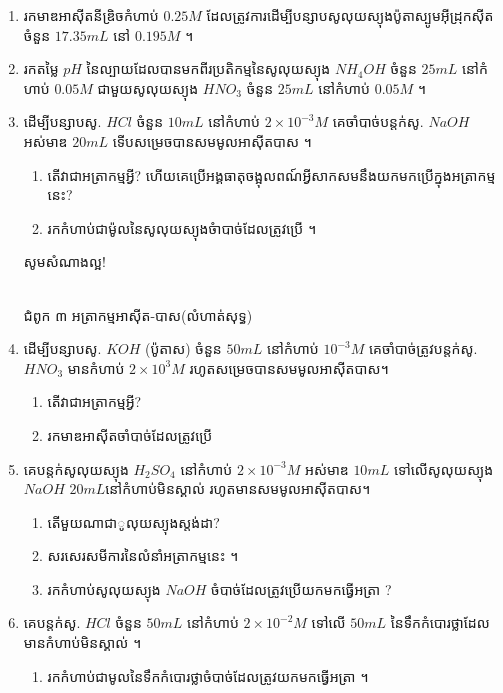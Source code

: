 \documentclass[12pt, a4paper]{article}
\begin{document}
\begin{enumerate}[m]
	\item រកមាឌអាស៊ីតនីឌ្រិចកំហាប់ $0.25M$ ដែលត្រូវការដើម្បីបន្សាបសូលុយស្យុងប៉ូតាស្បូមអ៊ីដ្រុកស៊ីតចំនួន $17.35mL$ នៅ $0.195M$ ។
	\item រកតម្លៃ $pH$ នៃល្បាយដែលបានមកពីរប្រតិកម្មនៃសូលុយស្យុង $NH_4OH$ ចំនួន $25mL$ នៅកំហាប់ $0.05M$ ជាមួយសូលុយស្យុង $HNO_3$ ចំនួន $25mL$ នៅកំហាប់ $0.05M$ ។
	\item ដើម្បីបន្សាបសូ. $HCl$ ចំនួន $10mL$ នៅកំហាប់ $2\times10^{-3}M$ គេចាំបាច់បន្តក់សូ. $NaOH$ អស់មាឌ $20mL$ ទើបសម្រេចបានសមមូលអាស៊ីតបាស ។
	\begin{enumerate}[k]
		\item តើវាជាអត្រាកម្មអ្វី? ហើយគេប្រើអង្គធាតុចង្អុលពណ៍អ្វីសាកសមនឹងយកមកប្រើក្នុងអត្រាកម្មនេះ?
		\item រកកំហាប់ជាម៉ូលនៃសូលុយស្យុងចំាបាច់ដែលត្រូវប្រើ ។
	\end{enumerate}
	\begin{center}
		\sffamily\color{black}
		សូមសំណាងល្អ!
	\end{center}\newpage
	\begin{center}
		\sffamily\color{black}
		\\
		ជំពូក ៣ អត្រាកម្មអាស៊ីត-បាស(លំហាត់សុទ្ធ)
	\end{center}
	\item ដើម្បីបន្សាបសូ. $KOH$ (ប៉ូតាស) ចំនួន $50mL$ នៅកំហាប់ $10^{-3}M$ គេចាំបាច់ត្រូវបន្តក់សូ. $HNO_3$ មានកំហាប់ $2\times 10^{3}M$ រហូតសម្រេចបានសមមូលអាស៊ីតបាស។
	\begin{enumerate}[k,2]
		\item តើវាជាអត្រាកម្មអ្វី? 
		\item រកមាឌអាស៊ីតចាំបាច់ដែលត្រូវប្រើ
	\end{enumerate}
	\item គេបន្តក់សូលុយស្យុង $H_2SO_4$ នៅកំហាប់ $2\times10^{-3}M$ អស់មាឌ $10mL$ ទៅលើសូលុយស្យុង $NaOH$ $20mL$នៅកំហាប់មិនស្គាល់ រហូតមានសមមូលអាស៊ីតបាស។
	\begin{enumerate}[k]
		\item តើមួយណាជាូលុយស្យុងស្តង់ដា?
		\item សរសេរសមីការនៃលំនាំអត្រាកម្មនេះ ។
		\item រកកំហាប់សូលុយស្យុង $NaOH$ ចំបាច់ដែលត្រូវប្រើយកមកធ្វើអត្រា ?
	\end{enumerate}
	\item គេបន្តក់សូ. $HCl$ ចំនួន $50mL$ នៅកំហាប់ $2\times 10^{-2}M$ ទៅលើ $50mL$ នៃទឹកកំបោរថ្លាដែលមានកំហាប់មិនស្គាល់ ។
	\begin{enumerate}[k]
		\item រកកំហាប់ជាមូលនៃទឹកកំបោរថ្លាចំបាច់ដែលត្រូវយកមកធ្វើអត្រា ។

\end{enumerate}
\end{enumerate}
\end{document}
